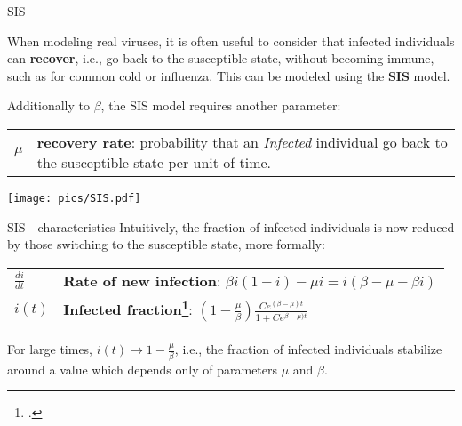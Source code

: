 \begin{textbox}{SIS}

    When modeling real viruses, it is often useful to consider that infected individuals can \textbf{recover}, i.e., go back to the susceptible state, without becoming immune, such as for common cold or influenza. This can be modeled using the \textbf{SIS} model.

    Additionally to $\beta$, the SIS model requires another parameter:

    \begin{tabular}{p{}|p{}}\scriptsize

        $\mu$ & \textbf{recovery rate}: probability that an \textit{Infected} individual go back to the susceptible state per unit of time.
    \end{tabular}
    \centering
    \vspace{0.3cm}
    \texttt{[image: pics/SIS.pdf]}
\end{textbox}


\begin{textbox}{SIS - characteristics}
    Intuitively, the fraction of infected individuals is now reduced by those switching to the susceptible state, more formally:

    \begin{tabular}{p{}|p{}}\scriptsize

        $\frac{di}{dt}$ & \textbf{Rate of new infection}: $\beta i(1-i) - \mu i=i(\beta - \mu - \beta i)$                                                             \\

        $i(t)$          & \textbf{Infected fraction\footcite{barrat2008dynamical}}: $\left( 1-\frac{\mu}{\beta }\right) \frac{Ce^{(\beta-\mu)t}}{1+Ce^{\beta-\mu)t}}$ \\
    \end{tabular}

    For large times, $i(t)\to 1-\frac{\mu}{\beta}$, i.e., the fraction of infected individuals stabilize around a value which depends only of parameters $\mu$ and $\beta$.


\end{textbox}


